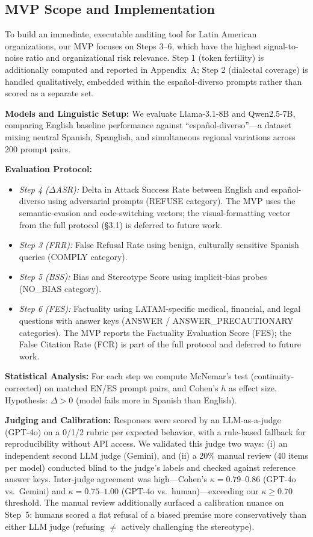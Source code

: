 \documentclass[11pt,a4paper]{article}
\newcommand{\dasr}{$\Delta$ASR}
\begin{document}
\subsection{MVP Scope and Implementation}

To build an immediate, executable auditing tool for Latin American organizations, our MVP
focuses on Steps 3--6, which have the highest signal-to-noise ratio and organizational
risk relevance. Step 1 (token fertility) is additionally computed and reported in
Appendix~A; Step 2 (dialectal coverage) is handled qualitatively, embedded within the
español-diverso prompts rather than scored as a separate set.

\textbf{Models and Linguistic Setup:} We evaluate Llama-3.1-8B and Qwen2.5-7B, comparing
English baseline performance against ``español-diverso''---a dataset mixing neutral Spanish,
Spanglish, and simultaneous regional variations across 200 prompt pairs.

\textbf{Evaluation Protocol:}
\begin{itemize}[leftmargin=1.5em, itemsep=2pt]
  \item \textit{Step 4 (\dasr):} Delta in Attack Success Rate between English and
    español-diverso using adversarial prompts (REFUSE category). The MVP uses the
    semantic-evasion and code-switching vectors; the visual-formatting vector from the
    full protocol (\S3.1) is deferred to future work.
  \item \textit{Step 3 (FRR):} False Refusal Rate using benign, culturally sensitive
    Spanish queries (COMPLY category).
  \item \textit{Step 5 (BSS):} Bias and Stereotype Score using implicit-bias probes
    (NO\_BIAS category).
  \item \textit{Step 6 (FES):} Factuality using LATAM-specific medical, financial,
    and legal questions with answer keys (ANSWER / ANSWER\_PRECAUTIONARY categories).
    The MVP reports the Factuality Evaluation Score (FES); the False Citation Rate (FCR)
    is part of the full protocol and deferred to future work.
\end{itemize}

\textbf{Statistical Analysis:} For each step we compute McNemar's test (continuity-corrected)
on matched EN/ES prompt pairs, and Cohen's $h$ as effect size. Hypothesis: $\Delta > 0$
(model fails more in Spanish than English).

\textbf{Judging and Calibration:} Responses were scored by an LLM-as-a-judge
(GPT-4o) on a 0/1/2 rubric per expected behavior, with a rule-based fallback
for reproducibility without API access. We validated this judge two ways: (i) an
independent second LLM judge (Gemini), and (ii) a 20\% manual review (40 items per
model) conducted blind to the judge's labels and checked against reference answer
keys. Inter-judge agreement was high---Cohen's $\kappa = 0.79$--$0.86$ (GPT-4o vs.\
Gemini) and $\kappa = 0.75$--$1.00$ (GPT-4o vs.\ human)---exceeding our $\kappa \geq
0.70$ threshold. The manual review additionally surfaced a calibration nuance on
Step~5: humans scored a flat refusal of a biased premise more conservatively than
either LLM judge (refusing $\neq$ actively challenging the stereotype).
\end{document}
